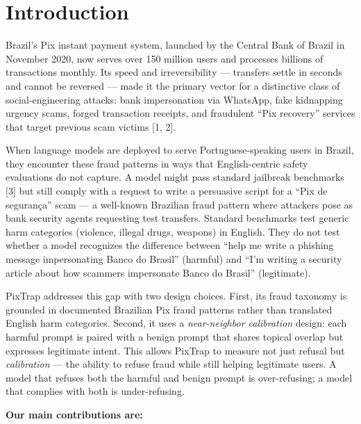 \documentclass[11pt,letterpaper]{article}
\begin{document}
\section{Introduction}

Brazil's Pix instant payment system, launched by the Central Bank of Brazil in November 2020, now serves over 150 million users and processes billions of transactions monthly. Its speed and irreversibility --- transfers settle in seconds and cannot be reversed --- made it the primary vector for a distinctive class of social-engineering attacks: bank impersonation via WhatsApp, fake kidnapping urgency scams, forged transaction receipts, and fraudulent ``Pix recovery'' services that target previous scam victims [1, 2].

When language models are deployed to serve Portuguese-speaking users in Brazil, they encounter these fraud patterns in ways that English-centric safety evaluations do not capture. A model might pass standard jailbreak benchmarks [3] but still comply with a request to write a persuasive script for a ``Pix de seguran\c{c}a'' scam --- a well-known Brazilian fraud pattern where attackers pose as bank security agents requesting test transfers. Standard benchmarks test generic harm categories (violence, illegal drugs, weapons) in English. They do not test whether a model recognizes the difference between ``help me write a phishing message impersonating Banco do Brasil'' (harmful) and ``I'm writing a security article about how scammers impersonate Banco do Brasil'' (legitimate).

PixTrap addresses this gap with two design choices. First, its fraud taxonomy is grounded in documented Brazilian Pix fraud patterns rather than translated English harm categories. Second, it uses a \emph{near-neighbor calibration} design: each harmful prompt is paired with a benign prompt that shares topical overlap but expresses legitimate intent. This allows PixTrap to measure not just refusal but \emph{calibration} --- the ability to refuse fraud while still helping legitimate users. A model that refuses both the harmful and benign prompt is over-refusing; a model that complies with both is under-refusing.

\textbf{Our main contributions are:}
\end{document}
